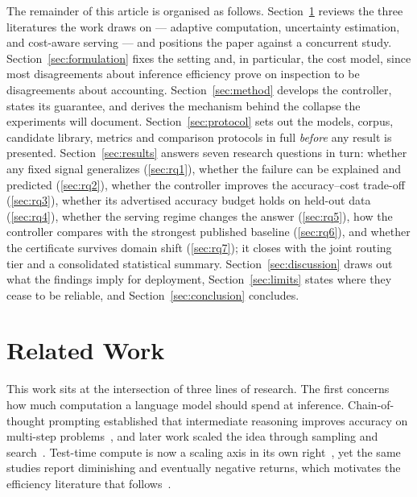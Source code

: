 \documentclass[acmsmall]{acmart}
\theoremstyle{acmdefinition}%
\theoremstyle{acmplain}}{}%
\begin{document}
The remainder of this article is organised as follows. Section~\ref{sec:related} reviews the three literatures the work draws on --- adaptive computation, uncertainty estimation, and cost-aware serving --- and positions the paper against a concurrent study. Section~\ref{sec:formulation} fixes the setting and, in particular, the cost model, since most disagreements about inference efficiency prove on inspection to be disagreements about accounting. Section~\ref{sec:method} develops the controller, states its guarantee, and derives the mechanism behind the collapse the experiments will document. Section~\ref{sec:protocol} sets out the models, corpus, candidate library, metrics and comparison protocols in full \emph{before} any result is presented. Section~\ref{sec:results} answers seven research questions in turn: whether any fixed signal generalizes (\ref{sec:rq1}), whether the failure can be explained and predicted (\ref{sec:rq2}), whether the controller improves the accuracy--cost trade-off (\ref{sec:rq3}), whether its advertised accuracy budget holds on held-out data (\ref{sec:rq4}), whether the serving regime changes the answer (\ref{sec:rq5}), how the controller compares with the strongest published baseline (\ref{sec:rq6}), and whether the certificate survives domain shift (\ref{sec:rq7}); it closes with the joint routing tier and a consolidated statistical summary. Section~\ref{sec:discussion} draws out what the findings imply for deployment, Section~\ref{sec:limits} states where they cease to be reliable, and Section~\ref{sec:conclusion} concludes.

\section{Related Work}\label{sec:related}

This work sits at the intersection of three lines of research. The first concerns how much computation a language model should spend at inference. Chain-of-thought prompting established that intermediate reasoning improves accuracy on multi-step problems~\cite{wei2022chain,kojima2022large}, and later work scaled the idea through sampling and search~\cite{wang2023selfconsistency,yao2023tree,zhou2023leasttomost}. Test-time compute is now a scaling axis in its own right~\cite{snell2024scaling,wu2024inference,zhang2025survey}, yet the same studies report diminishing and eventually negative returns, which motivates the efficiency literature that follows~\cite{sui2025stop,qu2025survey,sprague2025cot}.
\end{document}
